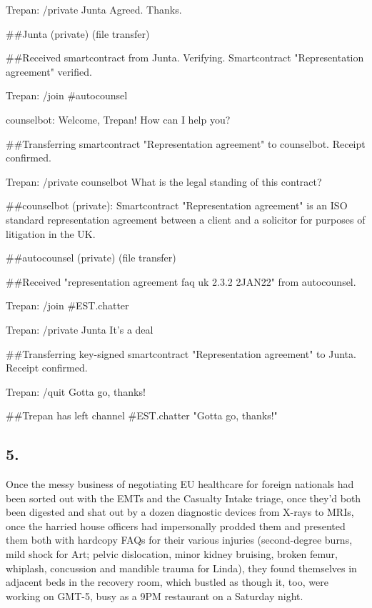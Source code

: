 {Trepan: /private Junta Agreed. Thanks.

\#\#Junta (private) (file transfer)

\#\#Received smartcontract from Junta. Verifying. Smartcontract
"Representation agreement" verified.

Trepan: /join \#autocounsel

counselbot: Welcome, Trepan! How can I help you?

\#\#Transferring smartcontract "Representation agreement" to
counselbot. Receipt confirmed.

Trepan: /private counselbot What is the legal standing of this
contract?

\#\#counselbot (private): Smartcontract "Representation agreement"
is an ISO standard representation agreement between a client and a
solicitor for purposes of litigation in the UK.

\#\#autocounsel (private) (file transfer)

\#\#Received "representation agreement faq uk 2.3.2 2JAN22" from
autocounsel.

Trepan: /join \#EST.chatter

Trepan: /private Junta It's a deal

\#\#Transferring key-signed smartcontract "Representation
agreement" to Junta. Receipt confirmed.

Trepan: /quit Gotta go, thanks!

\#\#Trepan has left channel \#EST.chatter "Gotta go, thanks!"

}

\subsection{5.}

Once the messy business of negotiating EU healthcare for foreign
nationals had been sorted out with the EMTs and the Casualty Intake
triage, once they’d both been digested and shat out by a dozen
diagnostic devices from X-rays to MRIs, once the harried house
officers had impersonally prodded them and presented them both with
hardcopy FAQs for their various injuries (second-degree burns, mild
shock for Art; pelvic dislocation, minor kidney bruising, broken
femur, whiplash, concussion and mandible trauma for Linda), they
found themselves in adjacent beds in the recovery room, which
bustled as though it, too, were working on GMT-5, busy as a 9PM
restaurant on a Saturday night.

